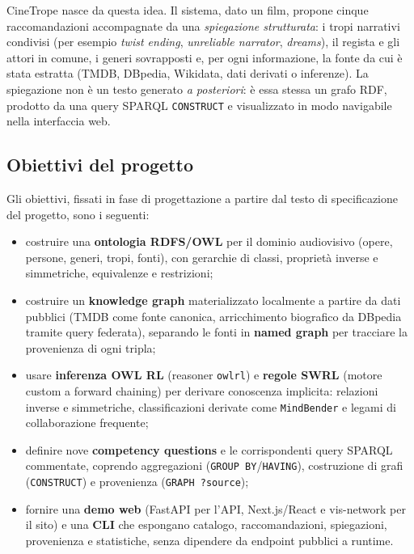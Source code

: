 \documentclass[a4paper,11pt]{article}
\newcommand{\code}[1]{\texttt{#1}}
\begin{document}
CineTrope nasce da questa idea. Il sistema, dato un film, propone cinque
raccomandazioni accompagnate da una \emph{spiegazione strutturata}: i tropi
narrativi condivisi (per esempio \emph{twist ending}, \emph{unreliable
narrator}, \emph{dreams}), il regista e gli attori in comune, i generi
sovrapposti e, per ogni informazione, la fonte da cui \`e stata estratta
(TMDB, DBpedia, Wikidata, dati derivati o inferenze). La spiegazione non \`e
un testo generato \emph{a posteriori}: \`e essa stessa un grafo RDF,
prodotto da una query SPARQL \code{CONSTRUCT} e visualizzato in modo
navigabile nella interfaccia web.

\subsection{Obiettivi del progetto}

Gli obiettivi, fissati in fase di progettazione a partire dal testo di
specificazione del progetto, sono i seguenti:

\begin{itemize}[nosep]
  \item costruire una \textbf{ontologia RDFS/OWL} per il dominio audiovisivo
        (opere, persone, generi, tropi, fonti), con gerarchie di classi,
        propriet\`a inverse e simmetriche, equivalenze e restrizioni;
  \item costruire un \textbf{knowledge graph} materializzato localmente a
        partire da dati pubblici (TMDB come fonte canonica, arricchimento
        biografico da DBpedia tramite query federata), separando le fonti in
        \textbf{named graph} per tracciare la provenienza di ogni tripla;
  \item usare \textbf{inferenza OWL RL} (reasoner \code{owlrl}) e
        \textbf{regole SWRL} (motore custom a forward chaining) per derivare
        conoscenza implicita: relazioni inverse e simmetriche, classificazioni
        derivate come \code{MindBender} e legami di collaborazione frequente;
  \item definire nove \textbf{competency questions} e le corrispondenti query
        SPARQL commentate, coprendo aggregazioni (\code{GROUP BY}/\code{HAVING}),
        costruzione di grafi (\code{CONSTRUCT}) e provenienza
        (\code{GRAPH ?source});
  \item fornire una \textbf{demo web} (FastAPI per l'API, Next.js/React e vis-network per il sito) e una
        \textbf{CLI} che espongano catalogo, raccomandazioni, spiegazioni,
        provenienza e statistiche, senza dipendere da endpoint pubblici a
        runtime.
\end{itemize}
\end{document}
